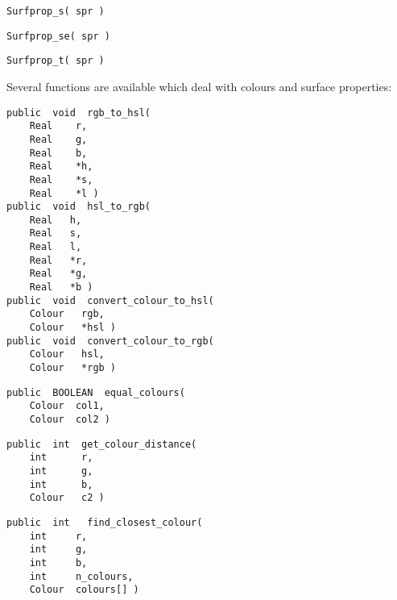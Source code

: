 
{\bf\begin{verbatim}
Surfprop_s( spr )
\end{verbatim}}


{\bf\begin{verbatim}
Surfprop_se( spr )
\end{verbatim}}


{\bf\begin{verbatim}
Surfprop_t( spr )
\end{verbatim}}


Several functions are available which deal with colours and surface
properties:

{\bf\begin{verbatim}
public  void  rgb_to_hsl(
    Real    r,
    Real    g,
    Real    b,
    Real    *h,
    Real    *s,
    Real    *l )
public  void  hsl_to_rgb(
    Real   h,
    Real   s,
    Real   l,
    Real   *r,
    Real   *g,
    Real   *b )
public  void  convert_colour_to_hsl(
    Colour   rgb,
    Colour   *hsl )
public  void  convert_colour_to_rgb(
    Colour   hsl,
    Colour   *rgb )
\end{verbatim}}


{\bf\begin{verbatim}
public  BOOLEAN  equal_colours(
    Colour  col1,
    Colour  col2 )
\end{verbatim}}


{\bf\begin{verbatim}
public  int  get_colour_distance(
    int      r,
    int      g,
    int      b,
    Colour   c2 )
\end{verbatim}}


{\bf\begin{verbatim}
public  int   find_closest_colour(
    int     r,
    int     g,
    int     b,
    int     n_colours,
    Colour  colours[] )
\end{verbatim}}

